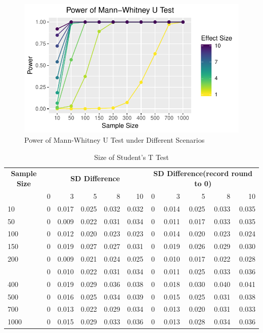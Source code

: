 \documentclass[]{article}
\begin{document}
\begin{figure}
\centering
\includegraphics{../figure/power_mw.pdf}
\caption{Power of Mann-Whitney U Test under Different Scenarios}
\end{figure}

\begin{table}

\caption{\label{tab:size-tables}Size of Student's T Test}
\centering
\begin{tabular}[t]{lrrrrrrrrrr}
\toprule
\multicolumn{1}{c}{\bfseries Sample Size} & \multicolumn{5}{c}{\bfseries SD Difference} & \multicolumn{5}{c}{\bfseries SD Difference(record round to 0)} \\
\cmidrule(l{2pt}r{2pt}){1-1} \cmidrule(l{2pt}r{2pt}){2-6} \cmidrule(l{2pt}r{2pt}){7-11}
  & 0 & 3 & 5 & 8 & 10 & 0 & 3 & 5 & 8 & 10\\
\midrule
10 & 0 & 0.017 & 0.025 & 0.032 & 0.032 & 0 & 0.014 & 0.025 & 0.033 & 0.035\\
50 & 0 & 0.009 & 0.022 & 0.031 & 0.034 & 0 & 0.011 & 0.017 & 0.033 & 0.035\\
100 & 0 & 0.012 & 0.020 & 0.023 & 0.023 & 0 & 0.014 & 0.020 & 0.023 & 0.024\\
150 & 0 & 0.019 & 0.027 & 0.027 & 0.031 & 0 & 0.019 & 0.026 & 0.029 & 0.030\\
200 & 0 & 0.009 & 0.021 & 0.024 & 0.025 & 0 & 0.010 & 0.017 & 0.022 & 0.028\\
\addlinespace
300 & 0 & 0.010 & 0.022 & 0.031 & 0.034 & 0 & 0.011 & 0.025 & 0.033 & 0.036\\
400 & 0 & 0.019 & 0.029 & 0.036 & 0.038 & 0 & 0.018 & 0.030 & 0.040 & 0.041\\
500 & 0 & 0.016 & 0.025 & 0.034 & 0.039 & 0 & 0.015 & 0.025 & 0.031 & 0.038\\
700 & 0 & 0.013 & 0.022 & 0.029 & 0.034 & 0 & 0.013 & 0.020 & 0.031 & 0.033\\
1000 & 0 & 0.015 & 0.029 & 0.033 & 0.036 & 0 & 0.013 & 0.028 & 0.034 & 0.036\\
\bottomrule
\end{tabular}
\end{table}
\end{document}
